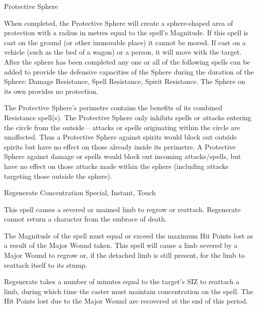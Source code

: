 \begin{rpg-spell}
{Protective Sphere}
{}

When completed, the Protective Sphere will create a sphere-shaped area of protection with a radius in metres equal to the spell’s Magnitude. If this spell is cast on the ground (or other immovable place) it cannot be moved. If cast on a vehicle (such as the bed of a wagon) or a person, it will move with the target.  After the sphere has been completed any one or all of the following spells can be added to provide the defensive capacities of the Sphere during the duration of the Sphere: Damage Resistance, Spell Resistance, Spirit Resistance. The Sphere on its own provides no protection.

The Protective Sphere’s perimetre contains the benefits of its combined Resistance spell(s). The Protective Sphere only inhibits spells or attacks entering the circle from the outside – attacks or spells originating within the circle are unaffected. Thus a Protective Sphere against spirits would block out outside spirits but have no effect on those already inside its perimetre. A Protective Sphere against damage or spells would block out incoming attacks/spells, but have no effect on those attacks made within the sphere (including attacks targeting those outside the sphere). 
\end{rpg-spell}


\begin{rpg-spell}
{Regenerate}
{Concentration Special, Instant, Touch}

This spell causes a severed or maimed limb to regrow or reattach. Regenerate cannot return a character from the embrace of death. 

The Magnitude of the spell must equal or exceed the maximum Hit Points lost as a result of the Major Wound taken. This spell will cause a limb severed by a Major Wound to regrow or, if the detached limb is still present, for the limb to reattach itself to its stump. 

Regenerate takes a number of minutes equal to the target’s SIZ to reattach a limb, during which time the caster must maintain concentration on the spell. The Hit Points lost due to the Major Wound are recovered at the end of this period.
\end{rpg-spell}


